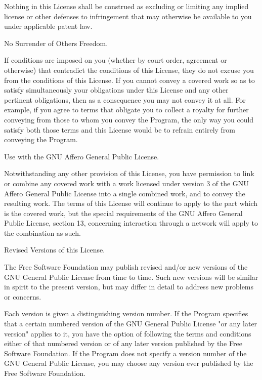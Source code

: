 Nothing in this License shall be construed as excluding or limiting any implied license or other defenses to infringement that may otherwise be available to you under applicable patent law.


\begin{DoxyEnumerate}
\item No Surrender of Others\textquotesingle{} Freedom.
\end{DoxyEnumerate}

If conditions are imposed on you (whether by court order, agreement or otherwise) that contradict the conditions of this License, they do not excuse you from the conditions of this License. If you cannot convey a covered work so as to satisfy simultaneously your obligations under this License and any other pertinent obligations, then as a consequence you may not convey it at all. For example, if you agree to terms that obligate you to collect a royalty for further conveying from those to whom you convey the Program, the only way you could satisfy both those terms and this License would be to refrain entirely from conveying the Program.


\begin{DoxyEnumerate}
\item Use with the GNU Affero General Public License.
\end{DoxyEnumerate}

Notwithstanding any other provision of this License, you have permission to link or combine any covered work with a work licensed under version 3 of the GNU Affero General Public License into a single combined work, and to convey the resulting work. The terms of this License will continue to apply to the part which is the covered work, but the special requirements of the GNU Affero General Public License, section 13, concerning interaction through a network will apply to the combination as such.


\begin{DoxyEnumerate}
\item Revised Versions of this License.
\end{DoxyEnumerate}

The Free Software Foundation may publish revised and/or new versions of the GNU General Public License from time to time. Such new versions will be similar in spirit to the present version, but may differ in detail to address new problems or concerns.

Each version is given a distinguishing version number. If the Program specifies that a certain numbered version of the GNU General Public License "{}or any later version"{} applies to it, you have the option of following the terms and conditions either of that numbered version or of any later version published by the Free Software Foundation. If the Program does not specify a version number of the GNU General Public License, you may choose any version ever published by the Free Software Foundation.

